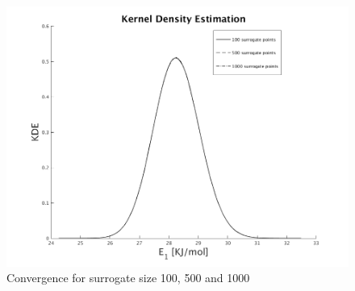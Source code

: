 \begin{figure}[H]
\includegraphics[scale=0.5]{model_1/conv_surrogate}
    \caption{Convergence for surrogate size 100, 500 and 1000}
    \label{fig-3:conv_surrogate}
\end{figure}


